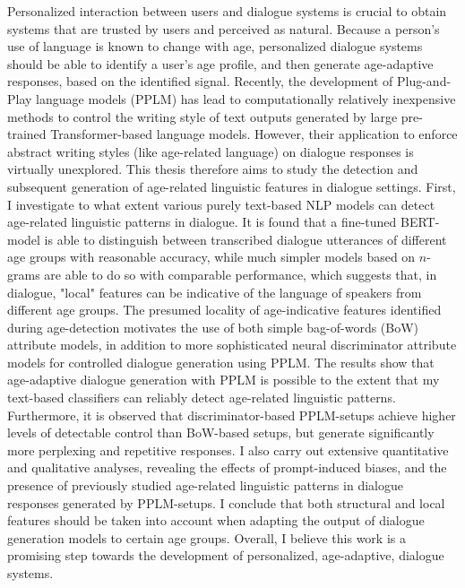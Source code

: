 Personalized interaction between users and dialogue systems is crucial to obtain systems that are trusted by users and perceived as natural.
Because a person's use of language is known to change with age, personalized dialogue systems should be able to identify a user's age profile, and then generate age-adaptive responses, based on the identified signal.
Recently, the development of Plug-and-Play language models (PPLM) has lead to computationally relatively inexpensive methods to control the writing style of text outputs generated by large pre-trained Transformer-based language models.
However, their application to enforce abstract writing styles (like age-related language) on dialogue responses is virtually unexplored.
This thesis therefore aims to study the detection and subsequent generation of age-related linguistic features in dialogue settings.
First, I investigate to what extent various purely text-based NLP models can detect age-related linguistic patterns in dialogue.
It is found that a fine-tuned BERT-model is able to distinguish between transcribed dialogue utterances of different age groups with reasonable accuracy, while much simpler models based on $n$-grams are able to do so with comparable performance, which suggests that, in dialogue, "local" features can be indicative of the language of speakers from different age groups.
The presumed locality of age-indicative features identified during age-detection motivates the use of both simple bag-of-words (BoW) attribute models, in addition to more sophisticated neural discriminator attribute models for controlled dialogue generation using PPLM.
The results show that age-adaptive dialogue generation with PPLM is possible to the extent that my text-based classifiers can reliably detect age-related linguistic patterns.
Furthermore, it is observed that discriminator-based PPLM-setups achieve higher levels of detectable control than BoW-based setups, but generate significantly more perplexing and repetitive responses.
I also carry out extensive quantitative and qualitative analyses, revealing the effects of prompt-induced biases, and the presence of previously studied age-related linguistic patterns in dialogue responses generated by PPLM-setups.
I conclude that both structural and local features should be taken into account when adapting the output of dialogue generation models to certain age groups.
Overall, I believe this work is a promising step towards the development of personalized, age-adaptive, dialogue systems.

